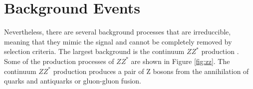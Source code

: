   \section{Background Events}
Nevertheless, there are several background processes that are irreduccible, meaning that they mimic the signal and cannot be completely removed by selection criteria. 
The largest background is the continuum $ZZ^*$ production \cite{CMS:2012qbp}. Some of the production processes of $ZZ^*$ are shown in Figure \ref{fig:zz}. The continuum $ZZ^*$ production produces a pair of Z bosons from the annihilation of quarks and antiquarks or gluon-gluon fusion. 

\begin{figure}[htbp]
    \centering
    \begin{minipage}{0.32\textwidth}
        \centering
    \end{minipage}
    \begin{minipage}{0.32\textwidth}
        \centering
\end{minipage}
\end{figure}
